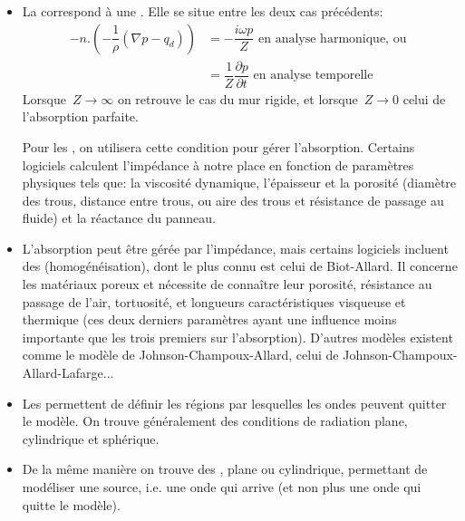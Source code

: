 \begin{itemize}
   \item La  correspond à une . Elle se situe entre les deux cas précédents:
   \begin{equation}
   \begin{array}{rll}
   -n.\left(-\dfrac1{\rho}(\nabla p-q_d)\right)
   &=-\dfrac{i\omega p}{Z} \text{ en analyse harmonique, ou }\\
   &=\dfrac{1}{Z}\dfrac{\partial p}{\partial t} \text{ en analyse temporelle}   
   \end{array}
   \end{equation}
   Lorsque~$Z\rightarrow\infty$ on retrouve le cas du mur rigide, et lorsque~$Z\rightarrow0$ celui de l'absorption parfaite.
   
   Pour les , on utilisera cette condition pour gérer l'absorption. Certains logiciels calculent l'impédance à notre place en fonction de paramètres physiques tels que: la viscosité dynamique, l'épaisseur et la porosité (diamètre des trous, distance entre trous, ou aire des trous et résistance de passage au fluide) et la réactance du panneau.
   
   \item L'absorption peut être gérée par l'impédance, mais certains logiciels incluent des  (homogénéisation), dont le plus connu est celui de Biot-Allard. Il concerne les matériaux poreux et nécessite de connaître leur porosité, résistance au passage de l'air, tortuosité, et longueurs caractéristiques visqueuse et thermique (ces deux derniers paramètres ayant une influence moins importante que les trois premiers sur l'absorption). D'autres modèles existent comme le modèle de Johnson-Champoux-Allard, celui de Johnson-Champoux-Allard-Lafarge...
   
   \item Les  permettent de définir les régions par lesquelles les ondes peuvent quitter le modèle. On trouve généralement des conditions de radiation plane, cylindrique et sphérique.
   \item De la même manière on trouve des , plane ou cylindrique, permettant de modéliser une source, i.e. une onde qui arrive (et non plus une onde qui quitte le modèle).
   

\end{itemize}
